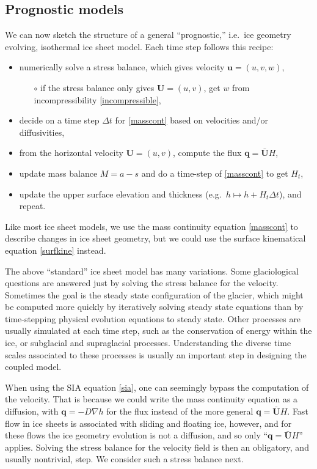 \documentclass[letterpaper,final,12pt,reqno]{amsart}
\newcommand{\bq}{\mathbf{q}}
\newcommand{\bU}{\mathbf{U}}
\begin{document}
\subsection*{Prognostic models}  We can now sketch the structure of a general ``prognostic,'' i.e.~ice geometry evolving, isothermal ice sheet model.  Each time step follows this recipe:
  \begin{itemize}
  \item numerically solve a stress balance, which gives velocity $\mathbf{u}=(u,v,w)$,
    \begin{itemize}
    \item[$\circ$] if the stress balance only gives $\mathbf{U}=(u,v)$, get $w$ from incompressibility \eqref{incompressible},
    \end{itemize}
  \item decide on a time step $\Delta t$ for \eqref{masscont} based on velocities and/or diffusivities,
  \item from the horizontal velocity $\mathbf{U}=(u,v)$, compute the flux $\bq = \bar{\bU} H$,
  \item update mass balance $M=a-s$ and do a time-step of \eqref{masscont} to get $H_t$,
  \item update the upper surface elevation and thickness (e.g.~$h \mapsto h + H_t \Delta t$), and repeat.
  \end{itemize}
Like most ice sheet models, we use the mass continuity equation \eqref{masscont} to describe changes in ice sheet geometry, but we could use the surface kinematical equation \eqref{surfkine} instead.

The above ``standard'' ice sheet model has many variations.  Some glaciological questions are answered just by solving the stress balance for the velocity.  Sometimes the goal is the steady state configuration of the glacier, which might be computed more quickly by iteratively solving steady state equations than by time-stepping physical evolution equations to steady state.  Other processes are usually simulated at each time step, such as the conservation of energy within the ice, or subglacial and supraglacial processes.  Understanding the diverse time scales associated to these processes is usually an important step in designing the coupled model.

When using the SIA equation \eqref{sia}, one can seemingly bypass the computation of the velocity.  That is because we could write the mass continuity equation as a diffusion, with $\bq=-D\nabla h$ for the flux instead of the more general $\bq = \bar{\bU} H$.  Fast flow in ice sheets is associated with sliding and floating ice, however, and for these flows the ice geometry evolution is not a diffusion, and so only ``$\bq = \bar{\bU} H$'' applies.  Solving the stress balance for the velocity field is then an obligatory, and usually nontrivial, step.  We consider such a stress balance next.
\end{document}
